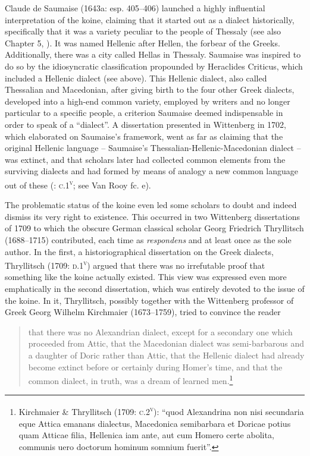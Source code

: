 Claude de Saumaise (1643a: esp. 405–406) launched a highly influential interpretation of the koine, claiming that it started out as a dialect historically, specifically that it was a variety peculiar to the people of Thessaly (see also Chapter 5, ). It was named Hellenic after Hellen, the forbear of the Greeks. Additionally, there was a city called Hellas in Thessaly. Saumaise was inspired to do so by the idiosyncratic classification propounded by Heraclides Criticus, which included a Hellenic dialect (see  above). This Hellenic dialect, also called Thessalian and Macedonian, after giving birth to the four other Greek dialects, developed into a high-end common variety, employed by writers and no longer particular to a specific people, a criterion Saumaise deemed indispensable in order to speak of a “dialect”. A dissertation presented in Wittenberg in 1702, which elaborated on Saumaise’s framework, went as far as claiming that the original Hellenic language – Saumaise’s Thessalian-Hellenic-Macedonian dialect – was extinct, and that scholars later had collected common elements from the surviving dialects and had formed by means of analogy a new common language out of these (\citealt{SchwartzHelm1702}: \textsc{c}.1\textsc{\textsuperscript{v}}; see Van Rooy fc. e).

The problematic status of the koine even led some scholars to doubt and indeed dismiss its very right to existence. This occurred in two Wittenberg dissertations of 1709 to which the obscure German classical scholar Georg Friedrich Thryllitsch (1688–1715) contributed, each time as \textit{respondens} and at least once as the sole author. In the first, a historiographical dissertation on the Greek dialects, Thryllitsch (1709: \textsc{d.1}\textsc{\textsuperscript{v}}) argued that there was no irrefutable proof that something like the koine actually existed. This view was expressed even more emphatically in the second dissertation, which was entirely devoted to the issue of the koine. In it, Thryllitsch, possibly together with the Wittenberg professor of Greek Georg Wilhelm Kirchmaier (1673–1759), tried to convince the reader

\begin{quote}
that there was no Alexandrian dialect, except for a secondary one which proceeded from Attic, that the Macedonian dialect was semi-barbarous and a daughter of Doric rather than Attic, that the Hellenic dialect had already become extinct before or certainly during Homer’s time, and that the common dialect, in truth, was a dream of learned men.\footnote{Kirchmaier \& Thryllitsch (1709: \textsc{c.2}\textsc{\textsuperscript{v}}): “quod Alexandrina non nisi secundaria eque Attica emanans dialectus, Macedonica semibarbara et Doricae potius quam Atticae filia, Hellenica iam ante, aut cum Homero certe abolita, communis uero doctorum hominum somnium fuerit”.}
\end{quote}

